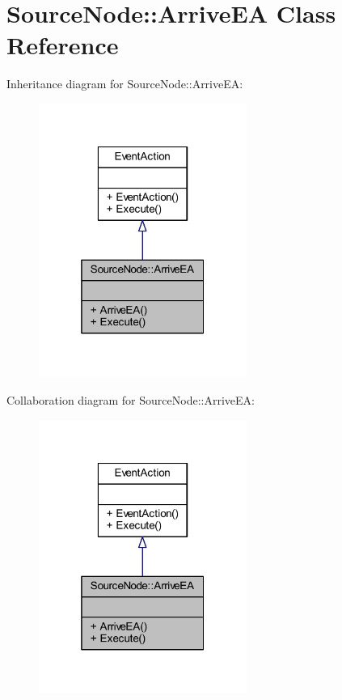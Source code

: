 \hypertarget{class_source_node_1_1_arrive_e_a}{}\section{Source\+Node\+:\+:Arrive\+EA Class Reference}
\label{class_source_node_1_1_arrive_e_a}


Inheritance diagram for Source\+Node\+:\+:Arrive\+EA\+:
\nopagebreak
\begin{figure}[H]
\begin{center}
\leavevmode
\includegraphics[width=193pt]{class_source_node_1_1_arrive_e_a__inherit__graph}
\end{center}
\end{figure}


Collaboration diagram for Source\+Node\+:\+:Arrive\+EA\+:
\nopagebreak
\begin{figure}[H]
\begin{center}
\leavevmode
\includegraphics[width=193pt]{class_source_node_1_1_arrive_e_a__coll__graph}
\end{center}
\end{figure}
